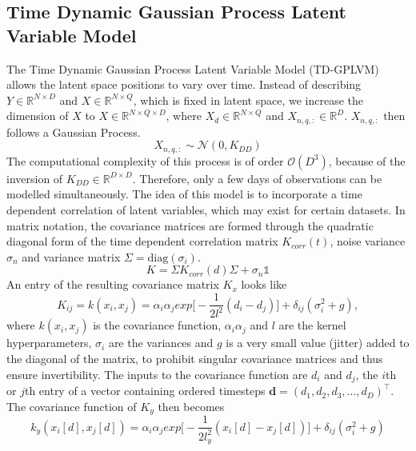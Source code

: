\subsection{Time Dynamic Gaussian Process Latent Variable Model}
\label{sec:td_gplvm}
The Time Dynamic Gaussian Process Latent Variable Model (TD-GPLVM) allows the latent space positions to vary over time. Instead of describing $Y \in \mathbb{R}^{N \times D}$ and $X \in \mathbb{R}^{N \times Q}$, which is fixed in latent space, we increase the dimension of $X$ to $X \in \mathbb{R}^{N \times Q \times D}$, where $X_d \in \mathbb{R}^{N \times Q}$ and $X_{n,q,:} \in \mathbb{R}^{D}$. $X_{n,q,:}$ then follows a Gaussian Process.  
\begin{equation}%
	 X_{n,q,:}  \sim \mathcal{N}(0, K_{DD})
\label{eq: TD-GPLVM Latent Space}
\end{equation}
The computational complexity of this process is of order $\mathcal{O}(D^3)$, because of the inversion of $K_{DD} \in \mathbb{R}^{D \times D}$. Therefore, only a few days of observations can be modelled simultaneously.  
The idea of this model is to incorporate a time dependent correlation of latent variables, which may exist for certain datasets. In matrix notation, the covariance matrices are formed through the quadratic diagonal form of the time dependent correlation matrix $K_{corr}(t)$, noise variance $\sigma_n$ and variance matrix $\Sigma = \text{diag}(\sigma_i)$.
\begin{equation}%
	K = \Sigma K_{corr}(d) \Sigma + \sigma_n \mathbb{1}
\label{eq: TD-GPLVM matrix form}
\end{equation}
An entry of the resulting covariance matrix $K_x$ looks like
\begin{equation}%
	K_{ij}=k(x_i,x_j) = \alpha_i\alpha_j exp\Big[-\frac{1}{2l^2}(d_i-d_j)\Big]+ \delta_{ij}(\sigma_i^2 + g),
\label{eq: TD-GPLVM K_x entry}
\end{equation}
where $k(x_i,x_j)$ is the covariance function, $\alpha_i\alpha_j$ and $l$ are the kernel hyperparameters, $\sigma_i$ are the variances and $g$ is a very small value (jitter) added to the diagonal of the matrix, to prohibit singular covariance matrices and thus ensure invertibility. The inputs to the covariance function are $d_i$ and $d_j$, the $i$th or $j$th entry of a vector containing ordered timesteps $\bm{d} = (d_1, d_2, d_3, ... , d_D)^{\top}$. The covariance function of $K_y$ then becomes
\begin{equation}%
	k_y(x_i[d], x_j[d]) = \alpha_i\alpha_j exp\Big[-\frac{1}{2l_y^2} (x_i[d]-x_j[d])\Big] + \delta_{ij}(\sigma_i^2 + g)
\label{eq: TD-GPLVM K_y entry}
\end{equation}
